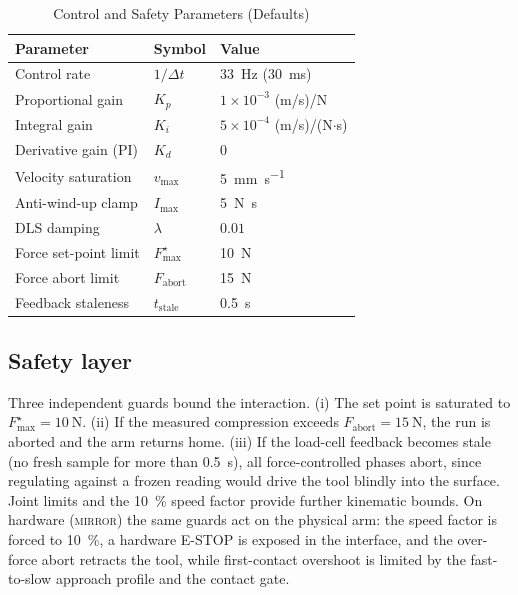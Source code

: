 \documentclass[conference]{IEEEtran}
\begin{document}
\begin{table}[t]
  \caption{Control and Safety Parameters (Defaults)}
  \label{tab:params}
  \centering
  \begin{tabular}{@{}lll@{}}
    \toprule
    \textbf{Parameter} & \textbf{Symbol} & \textbf{Value}\\
    \midrule
    Control rate            & $1/\Delta t$ & \SI{33}{\hertz} (\SI{30}{\milli\second})\\
    Proportional gain       & $K_p$        & $1\times10^{-3}$ (m/s)/N\\
    Integral gain           & $K_i$        & $5\times10^{-4}$ (m/s)/(N$\cdot$s)\\
    Derivative gain (PI)    & $K_d$        & $0$\\
    Velocity saturation     & $v_{\max}$   & \SI{5}{\milli\meter\per\second}\\
    Anti-wind-up clamp      & $I_{\max}$   & \SI{5}{\newton\second}\\
    DLS damping             & $\lambda$    & $0.01$\\
    Force set-point limit   & $F^\star_{\max}$ & \SI{10}{\newton}\\
    Force abort limit       & $F_{\mathrm{abort}}$ & \SI{15}{\newton}\\
    Feedback staleness      & $t_{\mathrm{stale}}$ & \SI{0.5}{\second}\\
    \bottomrule
  \end{tabular}
\end{table}

\subsection{Safety layer}
Three independent guards bound the interaction. (i) The set point is saturated to
$F^\star_{\max}=\SI{10}{\newton}$. (ii) If the measured compression exceeds
$F_{\mathrm{abort}}=\SI{15}{\newton}$, the run is aborted and the arm returns
home. (iii) If the load-cell feedback becomes stale (no fresh sample for more
than \SI{0.5}{\second}), all force-controlled phases abort, since regulating
against a frozen reading would drive the tool blindly into the surface. Joint
limits and the \SI{10}{\percent} speed factor provide further kinematic bounds.
On hardware (\textsc{mirror}) the same guards act on the physical arm: the speed
factor is forced to \SI{10}{\percent}, a hardware E-STOP is exposed in the
interface, and the over-force abort retracts the tool, while first-contact
overshoot is limited by the fast-to-slow approach profile and the contact gate.
\end{document}
